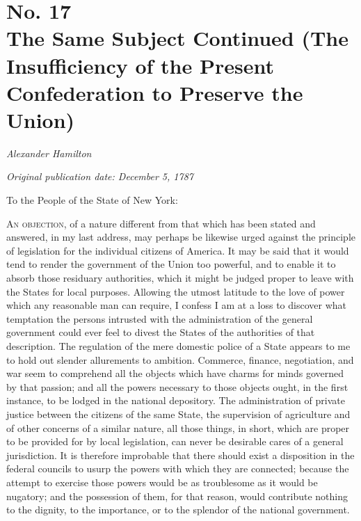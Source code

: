 \chapter[No. 17: The Same Subject Continued (The Insufficiency of the Present Confederation to Preserve the Union)]{No. 17\\ {\small The Same Subject Continued (The Insufficiency of the Present Confederation to Preserve the Union)}}

\textit{Alexander Hamilton}

\textit{Original publication date: December 5, 1787}
\vspace{1cm}

To the People of the State of New York:
\vspace{.4cm}

\textsc{An objection}, of a nature different from that which has been stated and answered, in my last address, may perhaps be likewise urged against the principle of legislation for the individual citizens of America. 
It may be said that it would tend to render the government of the Union too powerful, and to enable it to absorb those residuary authorities, which it might be judged proper to leave with the States for local purposes. 
Allowing the utmost latitude to the love of power which any reasonable man can require, I confess I am at a loss to discover what temptation the persons intrusted with the administration of the general government could ever feel to divest the States of the authorities of that description. 
The regulation of the mere domestic police of a State appears to me to hold out slender allurements to ambition. 
Commerce, finance, negotiation, and war seem to comprehend all the objects which have charms for minds governed by that passion; and all the powers necessary to those objects ought, in the first instance, to be lodged in the national depository. 
The administration of private justice between the citizens of the same State, the supervision of agriculture and of other concerns of a similar nature, all those things, in short, which are proper to be provided for by local legislation, can never be desirable cares of a general jurisdiction. 
It is therefore improbable that there should exist a disposition in the federal councils to usurp the powers with which they are connected; because the attempt to exercise those powers would be as troublesome as it would be nugatory; and the possession of them, for that reason, would contribute nothing to the dignity, to the importance, or to the splendor of the national government.

